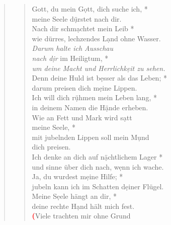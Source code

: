 \begin{quote}
\begin{verse}
\end{verse}
\end{quote}

\medskip

\def\greinitialformat#1{{\fontsize{40}{40}\selectfont #1}}
\gresetfirstlineaboveinitial{\small \textcolor{red}{Ps 63}}{}
\setaboveinitialseparation{0.72mm}



\vspace{0.5cm}

\begin{quote}
\begin{verse}
Gott, du mein G\d ott, dich suche ich, *\\ 
meine Seele d\d ürstet nach dir.\\ 
\vin Nach dir schm\d achtet mein Leib *\\ 
\vin wie dürres, lechzendes L\d and ohne Wasser.\\  
\textit{Darum halte ich Ausschau\\
nach d\d ir} im Heiligtum, *\\ 
\textit{um deine Macht und Herrlichk\d eit zu sehen.}\\ 
\vin Denn deine Huld ist b\d esser als das Leben; *\\ 
\vin darum preisen dich m\d eine Lippen.\\ 
Ich will dich r\d ühmen mein Leben lang, *\\ 
in deinem Namen die H\d ände erheben.\\ 
\vin Wie an Fett und Mark wird s\d att \\ 
\vin meine Seele, *\\ 
\vin mit jubelnden Lippen soll mein M\d und \\ 
\vin dich preisen.\\  
Ich denke an dich auf n\d ächtlichem Lager *\\ 
und sinne über dich nach, w\d enn ich wache.\\ 
\vin Ja, du wurdest m\d eine Hilfe; *\\ 
\vin jubeln kann ich im Schatten d\d einer Flügel.\\  
Meine S\d eele hängt an dir, *\\ 
deine rechte H\d and hält mich fest.\\ 
\vin \textcolor{red}{\bf{(}}Viele trachten mir ohne Grund\\ 

\end{verse}
\end{quote}
